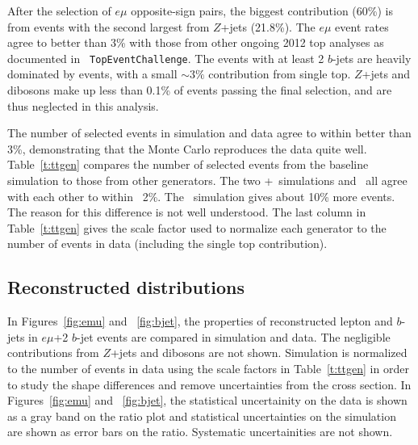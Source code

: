 After the selection of $e\mu$ opposite-sign pairs, the biggest contribution (60\%) is from \ttbar events with the second largest from $Z$+jets (21.8\%). The $e\mu$ event rates agree to  better than 3\% with those from other ongoing 2012 top analyses as documented in \texttt{ TopEventChallenge}\cite{topeventchallenge}. The events with at least 2 $b$-jets are heavily dominated by \ttbar events, with a small $\sim 3\%$ contribution from single top. $Z$+jets and dibosons make up less than 0.1\% of events passing the final selection, and are thus neglected in this analysis.


The number of selected events in simulation and data agree to within better than 3\%, demonstrating that the Monte Carlo reproduces the data quite well. Table~\ref{t:ttgen} compares the number of selected events from the baseline \ttbar simulation to those from other \ttbar generators. The two \pow+\py\ simulations and \mcnlohw\ all agree with each other to within ~2\%. The \madpy\ simulation gives about 10\% more events. The reason for this difference is not well understood. The last column in Table~\ref{t:ttgen} gives the scale factor used to normalize each \ttbar generator to the number of events in data (including the single top contribution).



\subsection{Reconstructed distributions}
In Figures~\ref{fig:emu} and ~\ref{fig:bjet}, the properties of reconstructed lepton and $b$-jets in $e\mu$+2 $b$-jet events are compared in simulation and data. The negligible contributions from $Z$+jets and dibosons are not shown. Simulation is normalized to the number of events in data using the scale factors in Table~\ref{t:ttgen} in order to study the shape differences and remove uncertainties from the \ttbar cross section. In Figures~\ref{fig:emu} and ~\ref{fig:bjet}, the statistical uncertainity on the data is shown as a gray band on the ratio plot and statistical uncertainties on the simulation are shown as error bars on the ratio. Systematic uncertainities are not shown.

